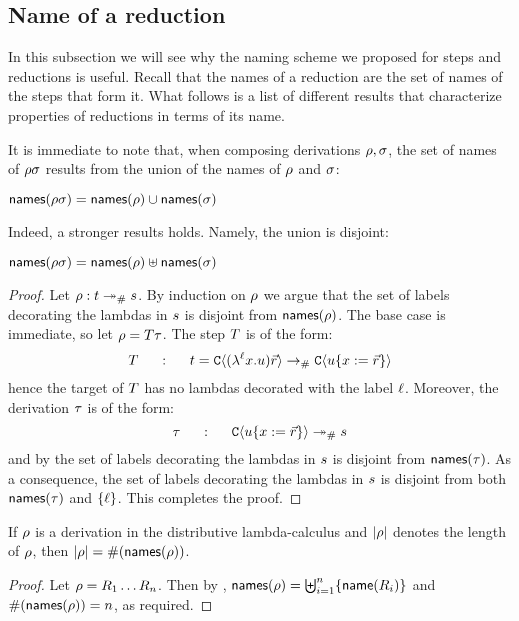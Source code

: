 \subsection*{Name of a reduction}

In this subsection we will see why the naming scheme we proposed for steps and
reductions is useful. Recall that the names of a reduction are the set of names of the steps that form it.
What follows is a list of different results that characterize properties
of reductions in terms of its name.

It is immediate to note that,
when composing derivations $\rho, \sigma$,
the set of names of $\rho\sigma$
results from the union of the names of $\rho$ and $\sigma$:

\begin{remark}
$\mathsf{names}(\rho\sigma) = \mathsf{names}(\rho) \cup \mathsf{names}(\sigma)$
\end{remark}

Indeed, a stronger results holds. Namely, the union is disjoint:

\begin{lemma}
$\mathsf{names}(\rho\sigma) = \mathsf{names}(\rho) \uplus \mathsf{names}(\sigma)$
\end{lemma}
\begin{proof}
Let $\rho : t \mathrel{\twoheadrightarrow_{\mathtt{\#}}} s$.
By induction on $\rho$ we argue that the set of labels decorating the lambdas in $s$
is disjoint from $\mathsf{names}(\rho)$.
The base case is immediate, so let $\rho = T\tau$.
The step $T$ is of the form:
\[
  T \hspace{.5cm}:\hspace{.5cm}
  t =
  \mathtt{C}\langle(\lambda^{\ell} x. u)\vec{r}\rangle
  \mathrel{\to_{\mathtt{\#}}}
  \mathtt{C}\langle u\{x := \vec{r}\}\rangle
\]
hence the target of $T$ has no lambdas decorated with the label $\ell$.
Moreover, the derivation $\tau$ is of the form:
\[
  \tau \hspace{.5cm}:\hspace{.5cm}
  \mathtt{C}\langle u\{x := \vec{r}\}\rangle
  \mathrel{\twoheadrightarrow_{\mathtt{\#}}}
  s
\]
and by \ih the set of labels decorating the lambdas in $s$
is disjoint from $\mathsf{names}(\tau)$.
As a consequence,
the set of labels decorating the lambdas in $s$
is disjoint from both $\mathsf{names}(\tau)$
and $\{\ell\}$.
This completes the proof.
\end{proof}

\begin{corollary}
If $\rho$ is a derivation in the distributive lambda-calculus
and $|\rho|$ denotes the length of $\rho$,
then
$|\rho| = \#(\mathsf{names}(\rho))$.
\end{corollary}
\begin{proof}
Let $\rho = R_1\hdots R_n$.
Then by ,
$\mathsf{names}(\rho) = \biguplus_{i=1}^{n} \{\mathsf{name}(R_i)\}$
and
$\#(\mathsf{names}(\rho)) = n$, as required.
\end{proof}


